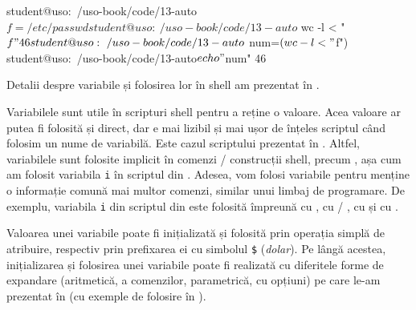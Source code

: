\begin{screen}[caption={Folosirea variabilelor în shell},label={lst:auto:use-vars}]
student@uso:~/uso-book/code/13-auto$ f=/etc/passwd
student@uso:~/uso-book/code/13-auto$ wc -l < "$f"
46
student@uso:~/uso-book/code/13-auto$ num=$(wc -l < "$f")
student@uso:~/uso-book/code/13-auto$ echo "$num"
46
\end{screen}

Detalii despre variabile și folosirea lor în shell am prezentat în .

Variabilele sunt utile în scripturi shell pentru a reține o valoare.
Acea valoare ar putea fi folosită și direct, dar e mai lizibil și mai ușor de înțeles scriptul când folosim un nume de variabilă.
Este cazul scriptului  prezentat în .
Altfel, variabilele sunt folosite implicit în comenzi / construcții shell, precum , așa cum am folosit variabila \texttt{i} în scriptul  din .
Adesea, vom folosi variabile pentru menține o informație comună mai multor comenzi, similar unui limbaj de programare.
De exemplu, variabila \texttt{i} din scriptul  din  este folosită împreună cu , cu  / , cu  și cu .

Valoarea unei variabile poate fi inițializată și folosită prin operația simplă de atribuire, respectiv prin prefixarea ei cu simbolul \texttt{\$} (\textit{dolar}).
Pe lângă acestea, inițializarea și folosirea unei variabile poate fi realizată cu diferitele forme de expandare (aritmetică, a comenzilor, parametrică, cu opțiuni) pe care le-am prezentat în  (cu exemple de folosire în ).


